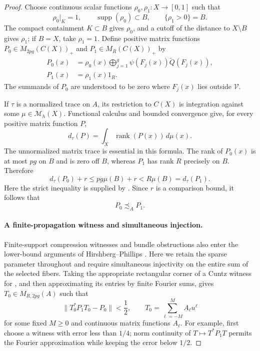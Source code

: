 \begin{proof}
Choose continuous scalar functions $\rho_0,\rho_1:X\to[0,1]$ such that
\[
 \rho_0|_K=1,\qquad \operatorname{supp}(\rho_0)\subset B,
 \qquad \{\rho_1>0\}=B.
\]
The compact containment $K\subset B$ gives $\rho_0$, and a cutoff of
the distance to $X\setminus B$ gives $\rho_1$; if $B=X$, take
$\rho_1=1$.  Define positive matrix functions
$P_0\in M_{2pg}(C(X))_+$ and $P_1\in M_R(C(X))_+$ by
\begin{equation}
\label{eq:comparison-positive-functions}
 \begin{split}
 P_0(x)&=\rho_0(x)\bigoplus_{j=1}^g
              \psi(F_j(x))\widetilde Q(F_j(x)),\\
 P_1(x)&=\rho_1(x)1_R.
 \end{split}
\end{equation}
The summands of $P_0$ are understood to be zero where $F_j(x)$ lies
outside $\mathcal V$.

If $\tau$ is a normalized trace on $A$, its restriction to $C(X)$ is
integration against some $\mu\in\mathcal M_h(X)$.  Functional calculus
and bounded convergence give, for every positive matrix function $P$,
\[
 d_\tau(P)=\int_X\operatorname{rank}(P(x))\,d\mu(x).
\]
The unnormalized matrix trace is essential in this formula.  The rank
of $P_0(x)$ is at most $pg$ on $B$ and is zero off $B$, whereas $P_1$
has rank $R$ precisely on $B$.  Therefore
\[
 d_\tau(P_0)+r\leq pg\mu(B)+r<R\mu(B)=d_\tau(P_1).
\]
Here the strict inequality is supplied by
.  Since $r$ is a comparison bound, it follows
that
\begin{equation}
\label{eq:allocated-cuntz-comparison}
 P_0\precsim_A P_1.
\end{equation}

\paragraph{A finite-propagation witness and simultaneous injection.}
Finite-support compression witnesses and bundle obstructions also enter
the lower-bound arguments of Hirshberg--Phillips
\cite[proofs of Theorems~3.3 and~4.5 in the author preprint]{HirshbergPhillips2022}.
Here we retain the sparse parameter throughout and require simultaneous
injectivity on the entire sum of the selected fibers.
Taking the appropriate rectangular corner of a Cuntz witness for
, and then approximating its entries
by finite Fourier sums, gives
$T_0\in M_{R,2pg}(A)$ such that
\begin{equation}
\label{eq:finite-propagation-witness}
 \|T_0^*P_1T_0-P_0\|<\frac12,
 \qquad
 T_0=\sum_{\ell=-M}^{M} A_\ell u^\ell
\end{equation}
for some fixed $M\geq0$ and continuous matrix functions $A_\ell$.
For example, first choose a witness with error less than $1/4$; norm
continuity of $T\mapsto T^*P_1T$ permits the Fourier approximation while
keeping the error below $1/2$.


\end{proof}
